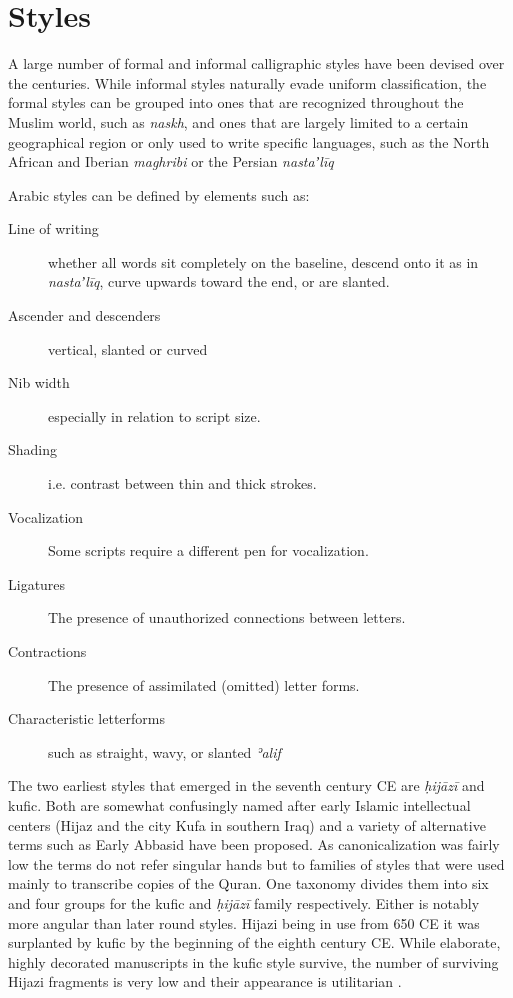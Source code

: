 \section{Styles}

A large number of formal and informal calligraphic styles have been devised
over the centuries. While informal styles naturally evade uniform
classification, the formal styles can be grouped into ones that are recognized
throughout the Muslim world, such as \emph{naskh}, and ones that are largely
limited to a certain geographical region or only used to write specific
languages, such as the North African and Iberian \emph{maghribi} or the Persian
\emph{nastaʼlīq}  

Arabic styles can be defined by elements such as\cite[pg. 242-243]{gacek2009arabic}:

\begin{description}
	\item[Line of writing] whether all words sit completely on the
			       baseline, descend onto it as in
			       \emph{nastaʼlīq}, curve upwards toward the end,
			       or are slanted.
	\item[Ascender and descenders] vertical, slanted or curved
	\item[Nib width] especially in relation to script size.
	\item[Shading] i.e. contrast between thin and thick strokes.
	\item[Vocalization] Some scripts require a different pen for vocalization.
	\item[Ligatures] The presence of unauthorized connections between letters.
	\item[Contractions] The presence of assimilated (omitted) letter forms.
	\item[Characteristic letterforms] such as straight, wavy, or slanted \emph{ʾalif}
\end{description}

The two earliest styles that emerged in the seventh century CE are
\emph{ḥijāzī} and kufic. Both are somewhat confusingly named after early
Islamic intellectual centers (Hijaz and the city Kufa in southern Iraq) and a
variety of alternative terms such as Early Abbasid have been proposed. As
canonicalization was fairly low the terms do not refer singular hands but to
families of styles that were used mainly to transcribe copies of the Quran. One
taxonomy divides them into six and four groups for the kufic and \emph{ḥijāzī}
family respectively. Either is notably more angular than later round styles.
Hijazi being in use from 650 CE it was surplanted by kufic by the beginning of
the eighth century CE. While elaborate, highly decorated manuscripts in the
kufic style survive, the number of surviving Hijazi fragments is very low and
their appearance is utilitarian \cite[pg. 98, 124]{gacek2009arabic}.

